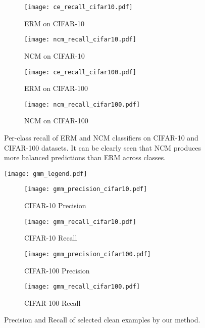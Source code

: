 \documentclass{article}
\begin{document}
\vspace{-0.55cm}
\begin{figure*}[h]
    \centering
    \begin{subfigure}[b]{0.24\textwidth}
        \centering
        \texttt{[image: ce\_recall\_cifar10.pdf]}
        \caption{ERM on CIFAR-10}
        \label{fig:ce_recall_cifar10}
    \end{subfigure}
    \begin{subfigure}[b]{0.24\textwidth}
        \centering
        \texttt{[image: ncm\_recall\_cifar10.pdf]} 
        \caption{NCM on CIFAR-10}\label{fig:ncm_recall_cifar10}
    \end{subfigure}
    \begin{subfigure}[b]{0.24\textwidth}
        \centering
        \texttt{[image: ce\_recall\_cifar100.pdf]} 
        \caption{ERM on CIFAR-100}\label{fig:ce_recall_cifar100}
    \end{subfigure}
    \begin{subfigure}[b]{0.24\textwidth}
        \centering
        \texttt{[image: ncm\_recall\_cifar100.pdf]} 
        \caption{NCM on CIFAR-100}\label{fig:ncm_recall_cifar100}
    \end{subfigure}
    \caption{Per-class recall of ERM and NCM classifiers on CIFAR-10 and CIFAR-100 datasets. It can be clearly seen that NCM produces more balanced predictions than ERM across classes.}
    \label{fig:recall-ce-ncm}
\end{figure*}


\vspace{-0.25cm}
\begin{figure*}[h]
    \centering
    \texttt{[image: gmm\_legend.pdf]}
    
    \begin{subfigure}[b]{0.24\textwidth}
        \centering
        \texttt{[image: gmm\_precision\_cifar10.pdf]}
        \caption{CIFAR-10 Precision}
        \label{fig:gmm_precision_cifar10}
    \end{subfigure}
    \begin{subfigure}[b]{0.24\textwidth}
        \centering
        \texttt{[image: gmm\_recall\_cifar10.pdf]} 
        \caption{CIFAR-10 Recall}\label{fig:gmm_recall_cifar10}
    \end{subfigure}
    \begin{subfigure}[b]{0.24\textwidth}
        \centering
        \texttt{[image: gmm\_precision\_cifar100.pdf]} 
        \caption{CIFAR-100 Precision}\label{fig:gmm_precision_cifar100}
    \end{subfigure}
    \begin{subfigure}[b]{0.24\textwidth}
        \centering
        \texttt{[image: gmm\_recall\_cifar100.pdf]} 
        \caption{CIFAR-100 Recall}\label{fig:gmm_recall_cifar100}
    \end{subfigure}
    \caption{Precision and Recall of selected clean examples by our method.}
    \label{fig:gmm-precision-recall}
\end{figure*}
\vspace{-0.2cm}
\end{document}
